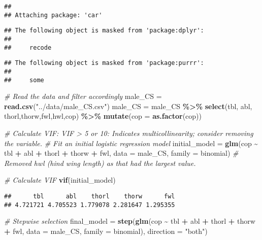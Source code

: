 \documentclass[
]{article}
\newenvironment{Shaded}{\begin{snugshade}}{\end{snugshade}}
\newcommand{\AttributeTok}[1]{\textcolor[rgb]{0.13,0.29,0.53}{#1}}
\newcommand{\CommentTok}[1]{\textcolor[rgb]{0.56,0.35,0.01}{\textit{#1}}}
\newcommand{\FunctionTok}[1]{\textcolor[rgb]{0.13,0.29,0.53}{\textbf{#1}}}
\newcommand{\NormalTok}[1]{#1}
\newcommand{\OtherTok}[1]{\textcolor[rgb]{0.56,0.35,0.01}{#1}}
\newcommand{\SpecialCharTok}[1]{\textcolor[rgb]{0.81,0.36,0.00}{\textbf{#1}}}
\newcommand{\StringTok}[1]{\textcolor[rgb]{0.31,0.60,0.02}{#1}}
\begin{document}
\begin{verbatim}
## 
## Attaching package: 'car'
\end{verbatim}

\begin{verbatim}
## The following object is masked from 'package:dplyr':
## 
##     recode
\end{verbatim}

\begin{verbatim}
## The following object is masked from 'package:purrr':
## 
##     some
\end{verbatim}

\begin{Shaded}
\begin{Highlighting}[]
\CommentTok{\# Read the data and filter accordingly}
\NormalTok{male\_CS }\OtherTok{=} \FunctionTok{read.csv}\NormalTok{(}\StringTok{"../data/male\_CS.csv"}\NormalTok{)}
\NormalTok{male\_CS }\OtherTok{=}\NormalTok{ male\_CS }\SpecialCharTok{\%\textgreater{}\%} 
  \FunctionTok{select}\NormalTok{(tbl, abl, thorl,thorw,fwl,hwl,cop) }\SpecialCharTok{\%\textgreater{}\%} 
  \FunctionTok{mutate}\NormalTok{(}\AttributeTok{cop =} \FunctionTok{as.factor}\NormalTok{(cop))}

\CommentTok{\# Calculate VIF: VIF \textgreater{} 5 or 10: Indicates multicollinearity; consider removing the variable.}
\CommentTok{\# Fit an initial logistic regression model}
\NormalTok{initial\_model }\OtherTok{=} \FunctionTok{glm}\NormalTok{(cop }\SpecialCharTok{\textasciitilde{}}\NormalTok{ tbl }\SpecialCharTok{+}\NormalTok{ abl }\SpecialCharTok{+}\NormalTok{ thorl }\SpecialCharTok{+}\NormalTok{ thorw }\SpecialCharTok{+}\NormalTok{ fwl, }\AttributeTok{data =}\NormalTok{ male\_CS, }\AttributeTok{family =}\NormalTok{ binomial) }\CommentTok{\# Removed hwl (hind wing length) as that had the largest value.}
                     

\CommentTok{\# Calculate VIF}
\FunctionTok{vif}\NormalTok{(initial\_model)}
\end{Highlighting}
\end{Shaded}

\begin{verbatim}
##      tbl      abl    thorl    thorw      fwl 
## 4.721721 4.705523 1.779078 2.281647 1.295355
\end{verbatim}

\begin{Shaded}
\begin{Highlighting}[]
\CommentTok{\# Stepwise selection}
\NormalTok{final\_model }\OtherTok{=} \FunctionTok{step}\NormalTok{(}\FunctionTok{glm}\NormalTok{(cop }\SpecialCharTok{\textasciitilde{}}\NormalTok{ tbl }\SpecialCharTok{+}\NormalTok{ abl }\SpecialCharTok{+}\NormalTok{ thorl }\SpecialCharTok{+}\NormalTok{ thorw }\SpecialCharTok{+}\NormalTok{ fwl, }
                        \AttributeTok{data =}\NormalTok{ male\_CS, }\AttributeTok{family =}\NormalTok{ binomial),}
                    \AttributeTok{direction =} \StringTok{"both"}\NormalTok{)}
\end{Highlighting}
\end{Shaded}
\end{document}
